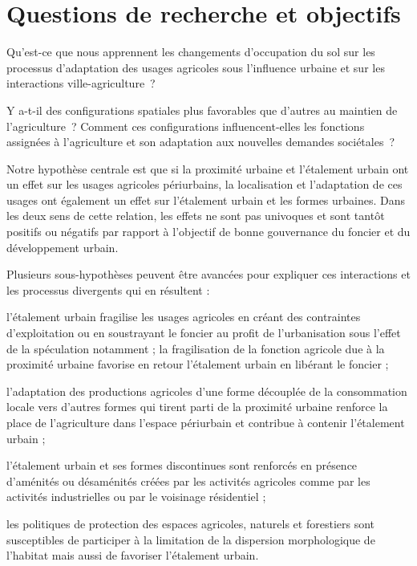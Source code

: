 \section{Questions de recherche et objectifs}

Qu'est-ce que nous apprennent les changements d'occupation du sol
sur les processus d'adaptation des usages agricoles sous l'influence urbaine
et sur les interactions ville-agriculture~?

Y a-t-il des configurations spatiales plus favorables
que d'autres au maintien de l'agriculture~?
Comment ces configurations influencent-elles les fonctions
assignées à l'agriculture et son adaptation aux nouvelles demandes sociétales~?

Notre hypothèse centrale est que si la proximité urbaine
et l'étalement urbain ont un effet sur les usages agricoles
périurbains, la localisation et l'adaptation de ces usages
ont également un effet sur l'étalement urbain et les formes urbaines.
Dans les deux sens de cette relation, les effets ne sont pas univoques
et sont tantôt positifs ou négatifs par rapport à l'objectif de bonne gouvernance
du foncier et du développement urbain.

Plusieurs sous-hypothèses peuvent être avancées
pour expliquer ces interactions et les processus divergents
qui en résultent :

\startitemize

\item l'étalement urbain fragilise les usages agricoles
     en créant des contraintes d'exploitation ou
     en soustrayant le foncier au profit de l'urbanisation
     sous l'effet de la spéculation notamment ;
     la fragilisation de la fonction agricole
     due à la proximité urbaine favorise en retour l'étalement urbain
     en libérant le foncier ;

\item l'adaptation des productions agricoles d'une forme
     découplée de la consommation locale vers d'autres
     formes qui tirent parti de la proximité urbaine
     renforce la place de l'agriculture dans l'espace périurbain
     et contribue à contenir l'étalement urbain ;

\item l'étalement urbain et ses formes discontinues sont renforcés
     en présence d'aménités ou désaménités créées par les activités
     agricoles comme par les activités industrielles
     ou par le voisinage résidentiel ;

\item les politiques de protection des espaces agricoles, naturels
     et forestiers sont susceptibles de participer
     à la limitation de la dispersion morphologique de l'habitat
     mais aussi de favoriser l'étalement urbain.

